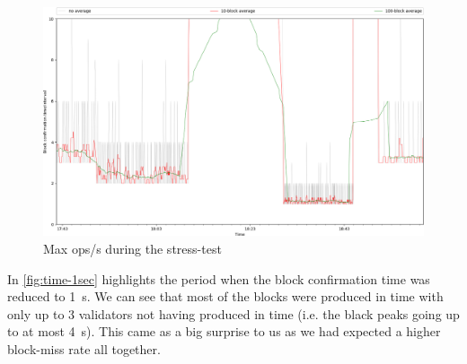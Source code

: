 \begin{figure}[!htp]
 \centering
 \includegraphics[width=\linewidth]{figures/stress-test-block-time-1sec.png}
 \caption{Max ops/s during the stress-test}
 \label{fig:time-1se}
\end{figure}

In \cref{fig:time-1sec} highlights the period when the block confirmation time
was reduced to \SI{1}{s}. We can see that most of the blocks were produced in
time with only up to 3 validators not having produced in time (i.e. the black
peaks going up to at most \SI{4}{s}). This came as a big surprise to us as we
had expected a higher block-miss rate all together.
